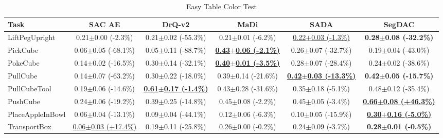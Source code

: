 \begin{table}[htbp]
\centering
\scriptsize
\caption{Easy Table Color Test}
\label{tab:appendix_tablecolortest_easy}
\begin{adjustbox}{max width=\textwidth}
\begin{tabular}{l*{5}{c}}
\toprule
\textbf{Task} & \textbf{SAC AE} & \textbf{DrQ-v2} & \textbf{MaDi} & \textbf{SADA} & \textbf{SegDAC} \\
\midrule
LiftPegUpright & 0.21$\pm$0.00 \scriptsize{(-2.3\%)} & 0.21$\pm$0.02 \scriptsize{(-55.3\%)} & 0.21$\pm$0.01 \scriptsize{(-6.2\%)} & \underline{0.22$\pm$0.03 \scriptsize{(-1.3\%)}} & \textbf{0.28$\pm$0.08 \scriptsize{(-32.2\%)}} \\
PickCube & 0.06$\pm$0.05 \scriptsize{(-68.1\%)} & 0.05$\pm$0.11 \scriptsize{(-88.7\%)} & \textbf{\underline{0.43$\pm$0.06 \scriptsize{(-2.1\%)}}} & 0.26$\pm$0.07 \scriptsize{(-32.7\%)} & 0.19$\pm$0.04 \scriptsize{(-43.0\%)} \\
PokeCube & 0.14$\pm$0.02 \scriptsize{(-16.5\%)} & 0.30$\pm$0.14 \scriptsize{(-32.1\%)} & \textbf{\underline{0.40$\pm$0.01 \scriptsize{(-3.5\%)}}} & 0.28$\pm$0.07 \scriptsize{(-28.4\%)} & 0.24$\pm$0.02 \scriptsize{(-38.6\%)} \\
PullCube & 0.14$\pm$0.07 \scriptsize{(-63.2\%)} & 0.30$\pm$0.22 \scriptsize{(-18.0\%)} & 0.39$\pm$0.14 \scriptsize{(-21.6\%)} & \textbf{\underline{0.42$\pm$0.03 \scriptsize{(-13.3\%)}}} & \textbf{0.42$\pm$0.05 \scriptsize{(-15.7\%)}} \\
PullCubeTool & 0.19$\pm$0.06 \scriptsize{(-14.6\%)} & \textbf{\underline{0.61$\pm$0.17 \scriptsize{(-1.4\%)}}} & 0.43$\pm$0.28 \scriptsize{(-31.6\%)} & 0.35$\pm$0.18 \scriptsize{(-5.1\%)} & 0.48$\pm$0.12 \scriptsize{(-35.4\%)} \\
PushCube & 0.24$\pm$0.06 \scriptsize{(-19.2\%)} & 0.39$\pm$0.25 \scriptsize{(-14.8\%)} & 0.45$\pm$0.08 \scriptsize{(-2.2\%)} & 0.45$\pm$0.05 \scriptsize{(-3.4\%)} & \textbf{\underline{0.66$\pm$0.08 \scriptsize{(+46.3\%)}}} \\
PlaceAppleInBowl & 0.06$\pm$0.04 \scriptsize{(-13.1\%)} & 0.09$\pm$0.04 \scriptsize{(-44.1\%)} & 0.12$\pm$0.06 \scriptsize{(-6.3\%)} & 0.10$\pm$0.05 \scriptsize{(-15.9\%)} & \textbf{\underline{0.30$\pm$0.16 \scriptsize{(-5.0\%)}}} \\
TransportBox & \underline{0.06$\pm$0.03 \scriptsize{(+17.4\%)}} & 0.19$\pm$0.11 \scriptsize{(-25.8\%)} & 0.26$\pm$0.00 \scriptsize{(-0.2\%)} & 0.24$\pm$0.09 \scriptsize{(-3.7\%)} & \textbf{0.28$\pm$0.01 \scriptsize{(-0.5\%)}} \\
\bottomrule
\end{tabular}
\end{adjustbox}
\end{table}


